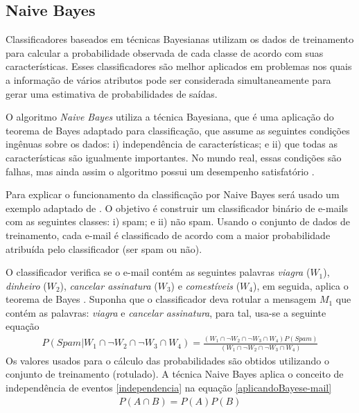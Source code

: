\subsection{Naive Bayes}
Classificadores baseados em técnicas Bayesianas utilizam os dados de treinamento para calcular a probabilidade observada de cada classe de acordo com suas características. Esses classificadores são melhor aplicados em problemas nos quais a informação de vários atributos pode ser considerada simultaneamente para gerar uma estimativa de probabilidades de saídas.

O algoritmo \emph{Naive Bayes} utiliza a técnica Bayesiana, que é uma aplicação do teorema de Bayes \cite{MachineLearningwithR2013} adaptado para classificação, que assume as seguintes condições ingênuas sobre os dados: i) independência de características; e ii) que todas as características são igualmente importantes. No mundo real, essas condições são falhas, mas ainda assim o algoritmo possui um desempenho satisfatório \cite{HanKamber2011}.

Para explicar o funcionamento da classificação por Naive Bayes será usado um exemplo adaptado de . O objetivo é construir um classificador binário de e-mails com as seguintes classes: i) spam; e ii) não spam. Usando o conjunto de dados de treinamento, cada e-mail é classificado de acordo com a maior probabilidade atribuída pelo classificador (ser spam ou não).

O classificador verifica se o e-mail contém as seguintes palavras \emph{viagra} (\(W_{1}\)), \emph{dinheiro} (\(W_{2}\)), \emph{cancelar assinatura} (\(W_{3}\)) e \emph{comestíveis} (\(W_{4}\)), em seguida,  aplica o teorema de Bayes \cite{MachineLearningwithR2013}. Suponha que o classificador deva rotular a mensagem \(M_{1}\) que contém as palavras: \emph{viagra} e \emph{cancelar assinatura}, para tal, usa-se a seguinte equação
\begin{align}
P(Spam|W_{1} \cap \neg W_{2} \cap \neg W_{3} \cap W_{4}) = \frac{(W_{1} \cap \neg W_{2} \cap \neg W_{3} \cap W_{4})P(Spam)}{(W_{1} \cap \neg W_{2} \cap \neg W_{3} \cap W_{4})} \label{aplicandoBayese-mail}
\end{align}
Os valores usados para o cálculo das probabilidades são obtidos utilizando o conjunto de treinamento (rotulado). A técnica Naive Bayes aplica o conceito de independência de eventos \eqref{independencia} na equação \eqref{aplicandoBayese-mail}
\begin{align}
P(A \cap B) = P(A)P(B) \label{independencia}
\end{align}

